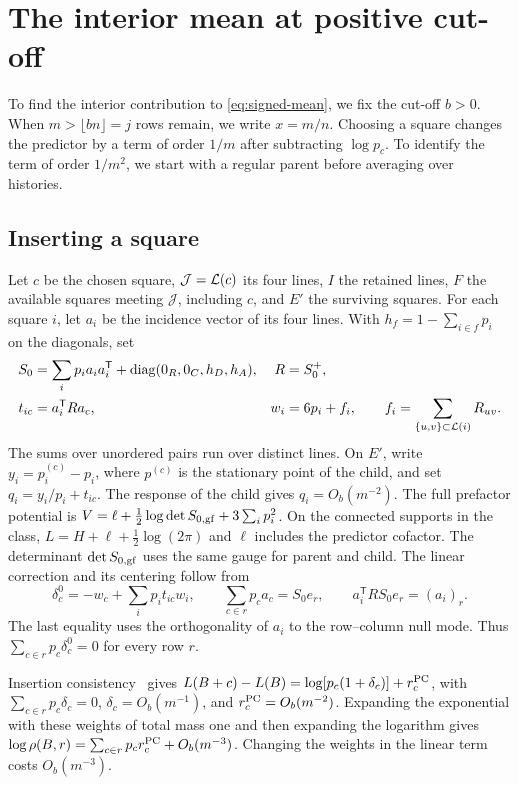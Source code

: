 \section{The interior mean at positive cut-off}\label{app:interior} To find the interior contribution to
\eqref{eq:signed-mean}, we fix the cut-off \(b>0\). When \(m>\lfloor bn\rfloor=j\) rows remain, we write
\(x=m/n\). Choosing a square changes the predictor by a term of order \(1/m\) after subtracting
\(\log p_c\). To identify the term of order \(1/m^2\), we start with a regular parent before averaging over
histories.

\subsection{Inserting a square} Let \(c\) be the chosen square, \(\mathcal J=\mathcal L(c)\) its four
lines, \(I\) the retained lines, \(F\) the available squares meeting \(\mathcal J\), including \(c\), and
\(E'\) the surviving squares. For each square \(i\), let \(a_i\) be the incidence vector of its four
lines. With \(h_f=1-\sum_{i\in f}p_i\) on the diagonals, set \begin{align*}
 S_0&=\sum_i p_i a_i a_i^{\mathsf T}+\operatorname{diag}(0_R,0_C,h_D,h_A),
 & R&=S_0^+,\\
 t_{ic}&=a_i^{\mathsf T}Ra_c,
 & w_i&=6p_i+f_i,\qquad f_i=\sum_{\{u,v\}\subset \mathcal L(i)}R_{uv}.
\end{align*} The sums over unordered pairs run over distinct lines. On \(E'\), write
\(y_i=p_i^{(c)}-p_i\), where \(p^{(c)}\) is the stationary point of the child, and set
\(q_i=y_i/p_i+t_{ic}\). The response of the child gives \(q_i=O_b(m^{-2})\). The full prefactor potential
is \(V=\ell+\tfrac12\log\det S_{0,\rm gf}+3\sum_i p_i^2\). On the connected supports in the class,
\(L=H+\ell+\tfrac12\log(2\pi)\) and \(\ell\) includes the predictor cofactor. The determinant \(\det
S_{0,\rm gf}\) uses the same gauge for parent and child. The linear correction and its centering follow
from \[
 \delta_c^0=-w_c+\sum_i p_i t_{ic}w_i,\qquad
 \sum_{c\in r}p_ca_c=S_0 e_r,\qquad a_i^{\mathsf T}RS_0 e_r=(a_i)_r .
\] The last equality uses the orthogonality of \(a_i\) to the row--column null mode. Thus \(\sum_{c\in
r}p_c\delta_c^0=0\) for every row \(r\).

Insertion consistency~\cite[Theorem 7.1 and Corollary 7.2]{pc} gives
\(L(B+c)-L(B)=\log[p_c(1+\delta_c)]+r_c^{\rm PC}\), with \(\sum_{c\in r}p_c\delta_c=0\),
\(\delta_c=O_b(m^{-1})\), and \(r_c^{\rm PC}=O_b(m^{-2})\). Expanding the exponential with these weights
of total mass one and then expanding the logarithm gives \(\log\rho(B,r)=\sum_{c\in r}p_c r_c^{\rm
PC}+O_b(m^{-3})\). Changing the weights in the linear term costs \(O_b(m^{-3})\).

